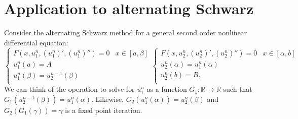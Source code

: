\documentclass{article}
\begin{document}
\section{Application to alternating Schwarz}
\label{sec:appl}

Consider the alternating Schwarz method for a general second order nonlinear differential equation:
\begin{equation} \label{eq:AS}
\begin{cases} F(x,u_1^n,(u_1^n)',(u_1^n)'') = 0 & x \in [a,\beta] \\
u^n_1(a) = A \\
u^n_1(\beta) = u_2^{n-1}(\beta) \\
\end{cases}
\begin{cases} F(x,u^n_2,(u^n_2)',(u^n_2)'') = 0 & x \in [\alpha,b] \\
u^n_2(\alpha) = u^n_1(\alpha) \\
u^n_2(b) = B . \\
\end{cases}
\end{equation}
We can think of the operation to solve for $u_1^n$ as a function $G_1: \mathbb{R} \rightarrow \mathbb{R}$ such that $G_1(u_2^{n-1}(\beta)) = u_1^n(\alpha)$.
Likewise, $G_2(u_1^n(\alpha)) = u_2^n(\beta)$ and $G_2(G_1(\gamma)) = \gamma$ is a fixed point iteration.
\end{document}
